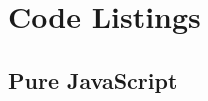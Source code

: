 \documentclass[12pt,letterpaper]{article}
\begin{document}













\newpage

\appendix
\section{Code Listings}
\label{app:code}

\subsection*{Pure JavaScript}
\end{document}
